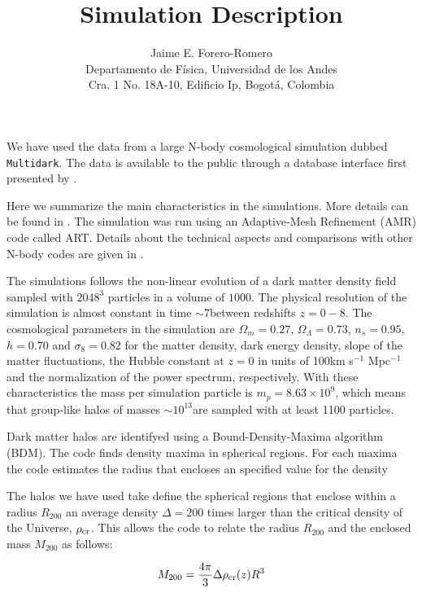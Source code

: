 \documentclass{article}
\title{Simulation Description}
\author{Jaime E. Forero-Romero\\ Departamento de F\'{i}sica, Universidad de los Andes\\ Cra. 1 No. 18A-10, Edificio Ip, Bogot\'a, Colombia}
\newcommand{\hMpc}{{\ifmmode{h^{-1}{\rm Mpc}}\else{$h^{-1}$Mpc }\fi}}
\newcommand{\hMpc}{{\ifmmode{h^{-1}{\rm kpc}}\else{$h^{-1}$kpc }\fi}}
\begin{document}
\maketitle
We have used the data from a large N-body cosmological simulation
dubbed \verb"Multidark". The data is available to the public through a
database interface first presented by \cite{Riebe11}. 

Here we summarize the main characteristics in the simulations. More
details can be found in \cite{Prada12}. The simulation was run using
an Adaptive-Mesh Refinement (AMR) code called ART. Details about the
technical aspects and comparisons with other N-body codes are given in
\cite{Klypin09}.   

The simulations follows the non-linear evolution of a dark matter
density field sampled with $2048^3$ particles in a volume of
$1000$\hMpc. The physical resolution of the simulation is almost
constant in time $\sim 7$\hkpc between redshifts $z=0-8$. The
cosmological parameters in the simulation are $\Omega_m=0.27$,
$\Omega_{\Lambda}=0.73$, $n_{s}=0.95$, $h=0.70$ and $\sigma_8=0.82$ for
the matter density, dark energy density, slope of the matter
fluctuations, the Hubble constant at $z=0$ in units of 100km s$^{-1}$
Mpc$^{-1}$ and the normalization of the power spectrum, respectively. 
With these characteristics the mass per simulation particle is
$m_p=8.63\times 10^{9}$\hMsun, which means that group-like halos of masses
$\sim 10^{13}$\hMsun are sampled with at least 1100 particles. 

Dark matter halos are identifyed using a Bound-Density-Maxima
algorithm (BDM). The code finds density maxima in spherical
regions. For each maxima the code estimates the radius that encloses
an specified value for the density

The halos we have used take define the spherical regions that enclose
within a radius $R_{200}$ an average density $\Delta=200$ times larger than the
critical density of the Universe, $\rho_{\rm cr}$. This allows the
code to relate the radius $R_{200}$ and the enclosed mass $M_{200}$ as
follows: 

\begin{equation}
M_{200} = \frac{4\pi}{3}\Delta \rho_{\rm cr}(z)R^{3}
\end{equation}



\end{document}
